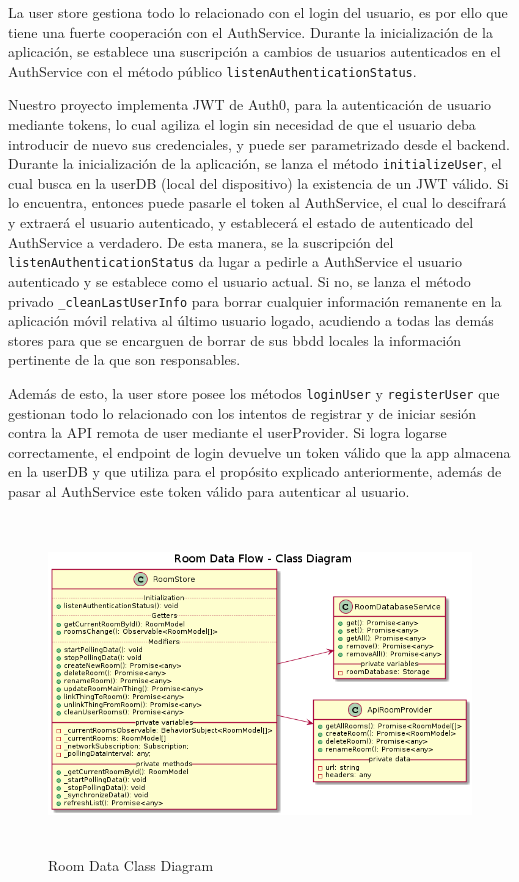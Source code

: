La user store gestiona todo lo relacionado con el login del usuario, es por ello que tiene una fuerte cooperación con el AuthService. Durante la inicialización de la aplicación, se establece una suscripción a cambios de usuarios autenticados en el AuthService con el método público \verb|listenAuthenticationStatus|.

\vspace{0.5cm}

Nuestro proyecto implementa JWT de Auth0, para la autenticación de usuario mediante tokens, lo cual agiliza el login sin necesidad de que el usuario deba introducir de nuevo sus credenciales, y puede ser parametrizado desde el backend. Durante la inicialización de la aplicación, se lanza el método \verb|initializeUser|, el cual busca en la userDB (local del dispositivo) la existencia de un JWT válido. Si lo encuentra, entonces puede pasarle el token al AuthService, el cual lo descifrará y extraerá el usuario autenticado, y establecerá el estado de autenticado del AuthService a verdadero. De esta manera, se la suscripción del \verb|listenAuthenticationStatus| da lugar a pedirle a AuthService el usuario autenticado y se establece como el usuario actual. Si no, se lanza el método privado \verb|_cleanLastUserInfo| para borrar cualquier información remanente en la aplicación móvil relativa al último usuario logado, acudiendo a todas las demás stores para que se encarguen de borrar de sus \gls{bbdd} locales la información pertinente de la que son responsables.

\vspace{1cm}

Además de esto, la user store posee los métodos \verb|loginUser| y \verb|registerUser| que gestionan todo lo relacionado con los intentos de registrar y de iniciar sesión contra la API remota de user mediante el userProvider. Si logra logarse correctamente, el endpoint de login devuelve un token válido que la app almacena en la userDB y que utiliza para el propósito explicado anteriormente, además de pasar al AuthService este token válido para autenticar al usuario.

\begin{figure}[hbt!]
\centering
\includegraphics[height=3.5in]{figures/diagrams/front/data-flow/room.png}
\caption[room]{Room Data Class Diagram\footnotemark}
\end{figure}

